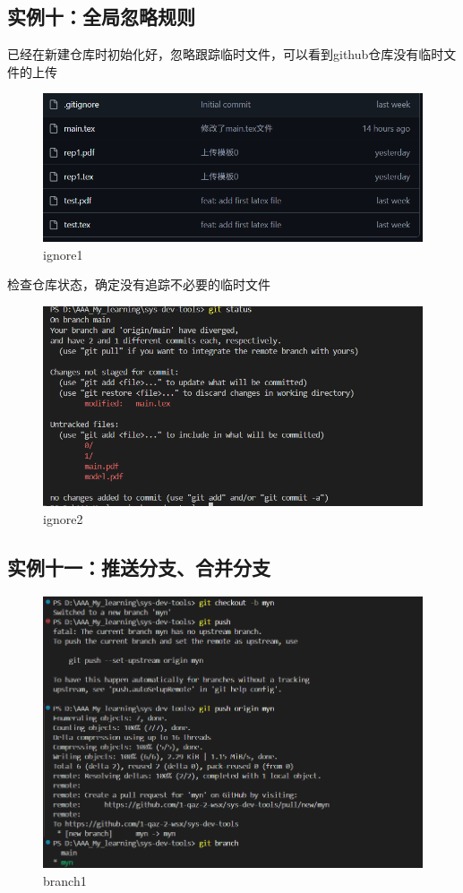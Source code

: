 \documentclass[a4paper]{article}
\begin{document}
\subsection{实例十：全局忽略规则}
已经在新建仓库时初始化好，忽略跟踪临时文件，可以看到github仓库没有临时文件的上传
    \begin{figure}[H]
    \centering
    \includegraphics[width=1\textwidth]{images/ignore1.png}
    \caption{ignore1}
    \end{figure}
检查仓库状态，确定没有追踪不必要的临时文件
        \begin{figure}[H]
    \centering
    \includegraphics[width=1\textwidth]{images/ignore2.png}
    \caption{ignore2}
    \end{figure}
\subsection{实例十一：推送分支、合并分支}
    \begin{figure}[H]
    \centering
    \includegraphics[width=1\textwidth]{images/branch1.png}
    \caption{branch1}
    \end{figure}
\end{document}
